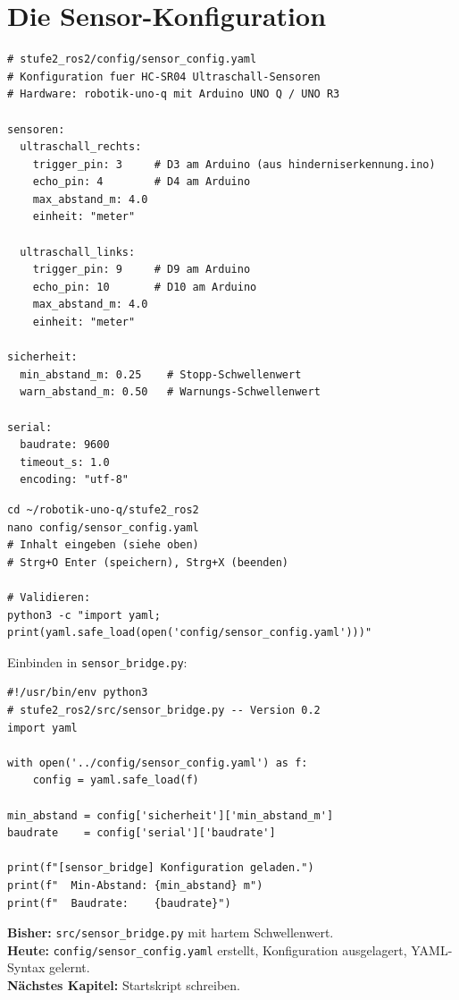 \section{Die Sensor-Konfiguration}

\begin{lstlisting}[style=yaml]
# stufe2_ros2/config/sensor_config.yaml
# Konfiguration fuer HC-SR04 Ultraschall-Sensoren
# Hardware: robotik-uno-q mit Arduino UNO Q / UNO R3

sensoren:
  ultraschall_rechts:
    trigger_pin: 3     # D3 am Arduino (aus hinderniserkennung.ino)
    echo_pin: 4        # D4 am Arduino
    max_abstand_m: 4.0
    einheit: "meter"

  ultraschall_links:
    trigger_pin: 9     # D9 am Arduino
    echo_pin: 10       # D10 am Arduino
    max_abstand_m: 4.0
    einheit: "meter"

sicherheit:
  min_abstand_m: 0.25    # Stopp-Schwellenwert
  warn_abstand_m: 0.50   # Warnungs-Schwellenwert

serial:
  baudrate: 9600
  timeout_s: 1.0
  encoding: "utf-8"
\end{lstlisting}

\begin{loesungBox}
\begin{lstlisting}[style=bash]
cd ~/robotik-uno-q/stufe2_ros2
nano config/sensor_config.yaml
# Inhalt eingeben (siehe oben)
# Strg+O Enter (speichern), Strg+X (beenden)

# Validieren:
python3 -c "import yaml; print(yaml.safe_load(open('config/sensor_config.yaml')))"
\end{lstlisting}

Einbinden in \texttt{sensor\_bridge.py}:
\begin{lstlisting}[style=python]
#!/usr/bin/env python3
# stufe2_ros2/src/sensor_bridge.py -- Version 0.2
import yaml

with open('../config/sensor_config.yaml') as f:
    config = yaml.safe_load(f)

min_abstand = config['sicherheit']['min_abstand_m']
baudrate    = config['serial']['baudrate']

print(f"[sensor_bridge] Konfiguration geladen.")
print(f"  Min-Abstand: {min_abstand} m")
print(f"  Baudrate:    {baudrate}")
\end{lstlisting}
\end{loesungBox}

\begin{projektBox}
\textbf{Bisher:} \texttt{src/sensor\_bridge.py} mit hartem Schwellenwert.\\
\textbf{Heute:} \texttt{config/sensor\_config.yaml} erstellt,
Konfiguration ausgelagert, YAML-Syntax gelernt.\\
\textbf{Nächstes Kapitel:} Startskript schreiben.
\end{projektBox}

